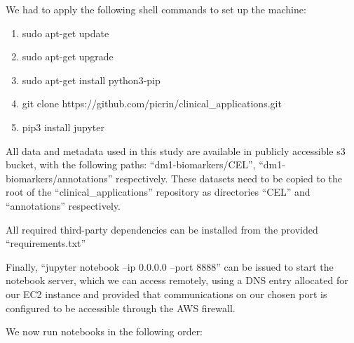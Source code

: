 \documentclass[10pt,letterpaper]{article}
\begin{document}
We had to apply the following shell commands to set up the machine:


\begin{enumerate}

\item sudo apt-get update
\item sudo apt-get upgrade
\item sudo apt-get install python3-pip
\item git clone https://github.com/picrin/clinical\_applications.git
\item pip3 install jupyter

\end{enumerate}

All data and metadata used in this study are available in publicly accessible s3 bucket, with the following paths: ``dm1-biomarkers/CEL'', ``dm1-biomarkers/annotations'' respectively. These datasets need to be copied to the root of the ``clinical\_applications'' repository as directories ``CEL'' and ``annotations'' respectively.

All required third-party dependencies can be installed from the provided ``requirements.txt''

Finally, ``jupyter notebook --ip 0.0.0.0 --port 8888'' can be issued to start the notebook server, which we can access remotely, using a DNS entry allocated for our EC2 instance and provided that communications on our chosen port is configured to be accessible through the AWS firewall.

We now run notebooks in the following order:
\end{document}
